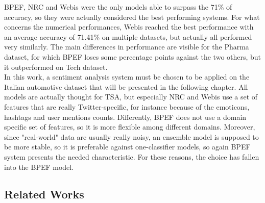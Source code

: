 BPEF, NRC and Webis were the only models able to surpass the 71\% of accuracy, so they were actually considered the best performing systems. For what concerns the numerical performances, Webis reached the best performance with an average accuracy of 71.41\% on multiple datasets, but actually all performed very similarly. The main differences in performance are visible for the Pharma dataset, for which BPEF loses some percentage points against the two others, but it outperformed on Tech dataset.\\
In this work, a sentiment analysis system must be chosen to be applied on the Italian automotive dataset that will be presented in the following chapter. All models are actually thought for \ac{TSA}, but especially NRC and Webis use a set of features that are really Twitter-specific, for instance because of the emoticons, hashtags and user mentions counts. Differently, BPEF does not use a domain specific set of features, so it is more flexible among different domains. Moreover, since "real-world" data are usually really noisy, an ensemble model is supposed to be more stable, so it is preferable against one-classifier models, so again BPEF system presents the needed characteristic. For these reasons, the choice has fallen into the BPEF model.



\subsection{Related Works}

